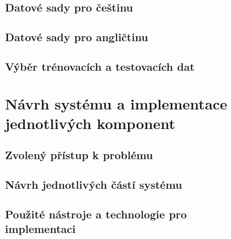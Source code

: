 \section{Datové sady pro češtinu}
\blindtext[4]

\section{Datové sady pro angličtinu}
\blindtext[4]

\section{Výběr trénovacích a testovacích dat}
\blindtext[4]





\chapter{Návrh systému a implementace jednotlivých komponent}
\label{design_and_implementation}

\blindtext[2]

\section{Zvolený přístup k problému}
\blindtext[6]

\section{Návrh jednotlivých částí systému}
\blindtext[15]

\section{Použité nástroje a technologie pro implementaci}
\blindtext[6]

